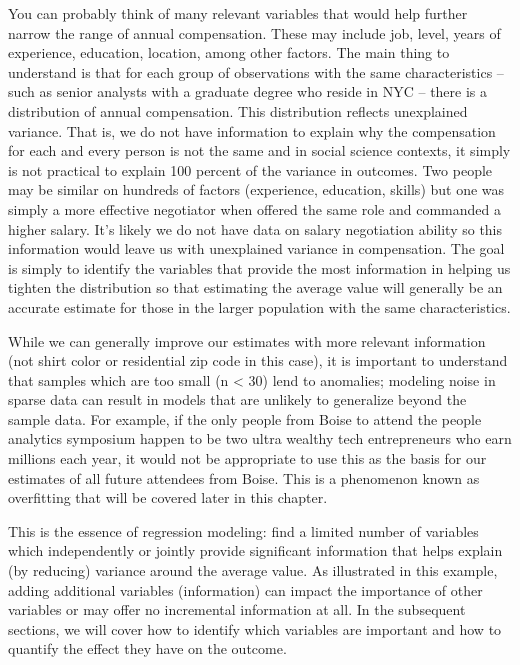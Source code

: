 \documentclass[]{book}
\begin{document}
You can probably think of many relevant variables that would help further narrow the range of annual compensation. These may include job, level, years of experience, education, location, among other factors. The main thing to understand is that for each group of observations with the same characteristics -- such as senior analysts with a graduate degree who reside in NYC -- there is a distribution of annual compensation. This distribution reflects unexplained variance. That is, we do not have information to explain why the compensation for each and every person is not the same and in social science contexts, it simply is not practical to explain 100 percent of the variance in outcomes. Two people may be similar on hundreds of factors (experience, education, skills) but one was simply a more effective negotiator when offered the same role and commanded a higher salary. It's likely we do not have data on salary negotiation ability so this information would leave us with unexplained variance in compensation. The goal is simply to identify the variables that provide the most information in helping us tighten the distribution so that estimating the average value will generally be an accurate estimate for those in the larger population with the same characteristics.

While we can generally improve our estimates with more relevant information (not shirt color or residential zip code in this case), it is important to understand that samples which are too small (n \textless{} 30) lend to anomalies; modeling noise in sparse data can result in models that are unlikely to generalize beyond the sample data. For example, if the only people from Boise to attend the people analytics symposium happen to be two ultra wealthy tech entrepreneurs who earn millions each year, it would not be appropriate to use this as the basis for our estimates of all future attendees from Boise. This is a phenomenon known as overfitting that will be covered later in this chapter.

This is the essence of regression modeling: find a limited number of variables which independently or jointly provide significant information that helps explain (by reducing) variance around the average value. As illustrated in this example, adding additional variables (information) can impact the importance of other variables or may offer no incremental information at all. In the subsequent sections, we will cover how to identify which variables are important and how to quantify the effect they have on the outcome.
\end{document}
